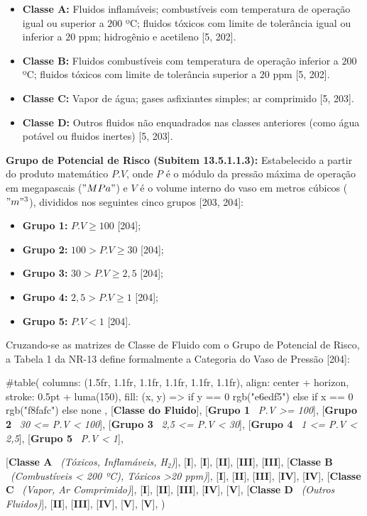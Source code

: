 \begin{itemize}
  \item \textbf{Classe A:} Fluidos inflamáveis; combustíveis com temperatura de operação igual ou superior a $200$ ºC; fluidos tóxicos com limite de tolerância igual ou inferior a $20$ ppm; hidrogênio e acetileno [5, 202].
  \item \textbf{Classe B:} Fluidos combustíveis com temperatura de operação inferior a $200$ ºC; fluidos tóxicos com limite de tolerância superior a $20$ ppm [5, 202].
  \item \textbf{Classe C:} Vapor de água; gases asfixiantes simples; ar comprimido [5, 203].
  \item \textbf{Classe D:} Outros fluidos não enquadrados nas classes anteriores (como água potável ou fluidos inertes) [5, 203].
\end{itemize}

\textbf{Grupo de Potencial de Risco (Subitem 13.5.1.1.3):} Estabelecido a partir do produto matemático $P.V$, onde $P$ é o módulo da pressão máxima de operação em megapascais ($"MPa"$) e $V$ é o volume interno do vaso em metros cúbicos ($"m"^3$), divididos nos seguintes cinco grupos [203, 204]:
\begin{itemize}
  \item \textbf{Grupo 1:} $P.V \ge  100$ [204];
  \item \textbf{Grupo 2:} $100 > P.V \ge  30$ [204];
  \item \textbf{Grupo 3:} $30 > P.V \ge  2,5$ [204];
  \item \textbf{Grupo 4:} $2,5 > P.V \ge  1$ [204];
  \item \textbf{Grupo 5:} $P.V < 1$ [204].
\end{itemize}

Cruzando-se as matrizes de Classe de Fluido com o Grupo de Potencial de Risco, a Tabela 1 da NR-13 define formalmente a Categoria do Vaso de Pressão [204]:

#table(
  columns: (1.5fr, 1.1fr, 1.1fr, 1.1fr, 1.1fr, 1.1fr),
  align: center + horizon,
  stroke: 0.5pt + luma(150),
  fill: (x, y) => if y == 0 { rgb("e6edf5") } else if x == 0 { rgb("f8fafc") } else { none },
  [\textbf{Classe do Fluido}],
  [\textbf{Grupo 1} \ \textit{P.V >= 100}],
  [\textbf{Grupo 2} \ \textit{30 <= P.V < 100}],
  [\textbf{Grupo 3} \ \textit{2,5 <= P.V < 30}],
  [\textbf{Grupo 4} \ \textit{1 <= P.V < 2,5}],
  [\textbf{Grupo 5} \ \textit{P.V < 1}],

  [\textbf{Classe A} \ \textit{(Tóxicos, Inflamáveis, H₂)}], [\textbf{I}], [\textbf{I}], [\textbf{II}], [\textbf{III}], [\textbf{III}],
  [\textbf{Classe B} \ \textit{(Combustíveis < 200 ºC), Tóxicos >20 ppm)}], [\textbf{I}], [\textbf{II}], [\textbf{III}], [\textbf{IV}], [\textbf{IV}],
  [\textbf{Classe C} \ \textit{(Vapor, Ar Comprimido)}], [\textbf{I}], [\textbf{II}], [\textbf{III}], [\textbf{IV}], [\textbf{V}],
  [\textbf{Classe D} \ \textit{(Outros Fluidos)}], [\textbf{II}], [\textbf{III}], [\textbf{IV}], [\textbf{V}], [\textbf{V}],
)

